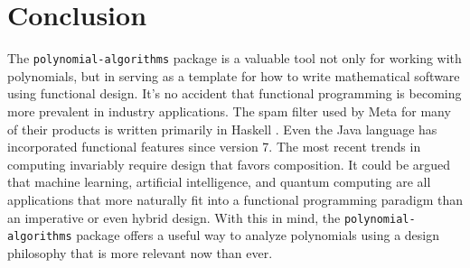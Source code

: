 \documentclass[MS, xcolor=dvipsnames]{wfuthesis}
\theoremstyle{definition}
\begin{document}

\chapter{Conclusion}
The \lstinline{polynomial-algorithms} package is a valuable tool not only for working with polynomials, but in serving as a template for how to write mathematical software using functional design. It's no accident that functional programming is becoming more prevalent in industry applications. The spam filter used by Meta for many of their products is written primarily in Haskell \cite{Marlow2015}. Even the Java language has incorporated functional features since version 7. The most recent trends in computing invariably require design that favors composition. It could be argued that machine learning, artificial intelligence, and quantum computing are all applications that more naturally fit into a functional programming paradigm than an imperative or even hybrid design. With this in mind, the \lstinline{polynomial-algorithms} package offers a useful way to analyze polynomials using a design philosophy that is more relevant now than ever.





\end{document}
